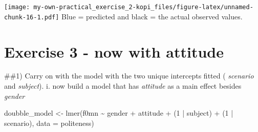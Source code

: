 \documentclass[
]{article}
\newenvironment{Shaded}{\begin{snugshade}}{\end{snugshade}}
\newcommand{\AttributeTok}[1]{\textcolor[rgb]{0.77,0.63,0.00}{#1}}
\newcommand{\CommentTok}[1]{\textcolor[rgb]{0.56,0.35,0.01}{\textit{#1}}}
\newcommand{\DecValTok}[1]{\textcolor[rgb]{0.00,0.00,0.81}{#1}}
\newcommand{\FunctionTok}[1]{\textcolor[rgb]{0.00,0.00,0.00}{#1}}
\newcommand{\NormalTok}[1]{#1}
\newcommand{\OtherTok}[1]{\textcolor[rgb]{0.56,0.35,0.01}{#1}}
\newcommand{\SpecialCharTok}[1]{\textcolor[rgb]{0.00,0.00,0.00}{#1}}
\newcommand{\StringTok}[1]{\textcolor[rgb]{0.31,0.60,0.02}{#1}}
\begin{document}
\begin{Shaded}
\end{Shaded}

\texttt{[image: my-own-practical\_exercise\_2-kopi\_files/figure-latex/unnamed-chunk-16-1.pdf]}
Blue = predicted and black = the actual observed values.

\hypertarget{exercise-3---now-with-attitude}{%
\section{Exercise 3 - now with
attitude}\label{exercise-3---now-with-attitude}}

\#\#1) Carry on with the model with the two unique intercepts fitted (
\emph{scenario} and \emph{subject}). i. now build a model that has
\emph{attitude} as a main effect besides \emph{gender}

\begin{Shaded}
\begin{Highlighting}[]
\NormalTok{doubble\_model }\OtherTok{\textless{}{-}} \FunctionTok{lmer}\NormalTok{(f0mn }\SpecialCharTok{\textasciitilde{}}\NormalTok{ gender }\SpecialCharTok{+}\NormalTok{ attitude }\SpecialCharTok{+}\NormalTok{ (}\DecValTok{1} \SpecialCharTok{|}\NormalTok{ subject) }\SpecialCharTok{+}\NormalTok{ (}\DecValTok{1} \SpecialCharTok{|}\NormalTok{ scenario), }\AttributeTok{data =}\NormalTok{ politeness)}
\end{Highlighting}
\end{Shaded}
\end{document}
